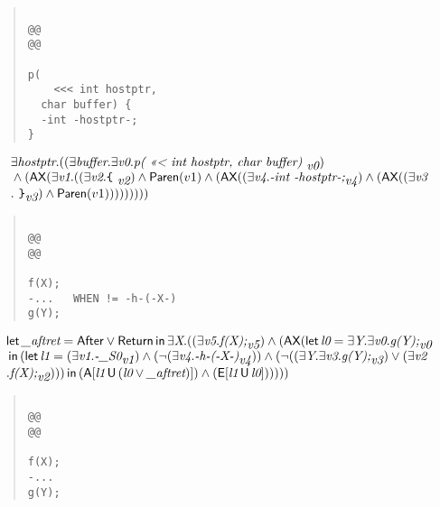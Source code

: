 \documentclass{article}
\newcommand{\U}{\,\mbox{\sf{U}}\,}
\newcommand{\A}{\mbox{\sf{A}}}
\newcommand{\E}{\mbox{\sf{E}}}
\newcommand{\AX}{\mbox{\sf{AX}}}
\newcommand{\mita}[1]{\mbox{\it{{#1}}}}
\newcommand{\msf}[1]{\mbox{\sf{{#1}}}}
\newcommand{\ttlb}{\mbox{\tt \char'173}}
\newcommand{\ttrb}{\mbox{\tt \char'175}}
\begin{document}
\begin{quote}\begin{verbatim}

@@
@@

p(
    <<< int hostptr, 
  char buffer) {
  -int -hostptr-;
}
\end{verbatim}\end{quote}

\[\begin{array}{l}
\exists \mita{hostptr} . ((\exists \mita{buffer} . \exists \mita{v0} . \mita{p(
    <<< int hostptr, 
  char buffer) }_{\mita{v0}})\\\mbox{} \wedge (\AX(\exists \mita{v1} . ((\exists \mita{v2} . \mita{{\ttlb}
  }_{\mita{v2}}) \wedge \msf{Paren}(v1) \wedge (\AX((\exists \mita{v4} . \mita{-int -hostptr-;}_{\mita{v4}}) \wedge (\AX((\exists \mita{v3}\\\mbox{} . \mita{
{\ttrb}}_{\mita{v3}}) \wedge \msf{Paren}(v1)))))))))
\end{array}\]

\begin{quote}\begin{verbatim}

@@
@@

f(X);
-...   WHEN != -h-(-X-)
g(Y);
\end{verbatim}\end{quote}

\[\begin{array}{l}
\mita{\sf{let}} \, \mita{\_aftret} = \msf{After} \vee \msf{Return} \, \mita{\sf{in}} \, \exists \mita{X} . ((\exists \mita{v5} . \mita{f(X);}_{\mita{v5}}) \wedge (\AX(\mita{\sf{let}} \, \mita{l0} = \exists \mita{Y} . \exists \mita{v0} . \mita{g(Y);}_{\mita{v0}}\\\mbox{} \, \mita{\sf{in}} \, (\mita{\sf{let}} \, \mita{l1} = (\exists \mita{v1} . \mita{-\_S0}_{\mita{v1}}) \wedge (\neg (\exists \mita{v4} . \mita{-h-(-X-)}_{\mita{v4}})) \wedge (\neg ((\exists \mita{Y} . \exists \mita{v3} . \mita{g(Y);}_{\mita{v3}}) \vee (\exists \mita{v2}\\\mbox{} . \mita{f(X);}_{\mita{v2}}))) \, \mita{\sf{in}} \, (\A[\mita{l1} \U (\mita{l0} \vee \mita{\_aftret})]
) \wedge (\E[\mita{l1} \U \mita{l0}]
)
)
)))

\end{array}\]

\begin{quote}\begin{verbatim}

@@
@@

f(X);
-...
g(Y);
\end{verbatim}\end{quote}
\end{document}
